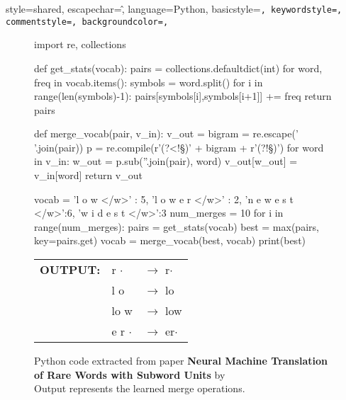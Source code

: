 {
    style=shared,
    escapechar=\^,
    language={Python},
    basicstyle=\small\tt,
    keywordstyle=\color{blue},
    commentstyle=\color[rgb]{0.13,0.54,0.13},
    backgroundcolor=\color{cyan!5},
}

{\lstset{style=python}}
{}

\begin{figure}
\begin{python}[h]
import re, collections

def get_stats(vocab):
    pairs = collections.defaultdict(int)
    for word, freq in vocab.items():
    symbols = word.split()
    for i in range(len(symbols)-1):
        pairs[symbols[i],symbols[i+1]] += freq
    return pairs

def merge_vocab(pair, v_in):
    v_out = {}
    bigram = re.escape(' '.join(pair))
    p = re.compile(r'(?<!\S)' + bigram + r'(?!\S)')
    for word in v_in:
        w_out = p.sub(''.join(pair), word)
        v_out[w_out] = v_in[word]
    return v_out

vocab = {'l o w </w>' : 5, 'l o w e r </w>' : 2,
            'n e w e s t </w>':6, 'w i d e s t </w>':3}
num_merges = 10
for i in range(num_merges):
    pairs = get_stats(vocab)
    best = max(pairs, key=pairs.get)
    vocab = merge_vocab(best, vocab)
    print(best)
\end{python}
\centering
\begin{tabular}{lll}

    \textbf{OUTPUT:} & r $\cdot$  &$\rightarrow$ r$\cdot$ \\
                    & l o         &$\rightarrow$ lo \\
                    & lo w        &$\rightarrow$ low \\
                    & e r $\cdot$ &$\rightarrow$ er$\cdot$ \\
\end{tabular}
\caption{Python code extracted from paper \textbf{Neural Machine Translation of Rare Words with Subword Units} by \citet{sennrich2016} \\ \centering Output represents the learned merge operations.}
\label{figure:bpe_algorithm}
\end{figure}
